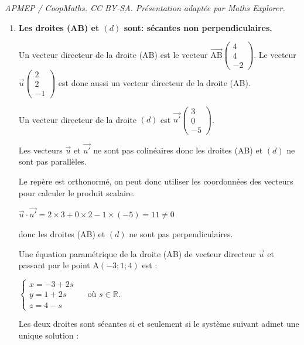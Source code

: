 \documentclass[10pt]{article}
\providecommand{\R}{\mathbb{R}}
\providecommand{\vect}[1]{\overrightarrow{#1}}
\begin{document}
\noindent\textit{APMEP / CoopMaths. CC BY-SA. Présentation adaptée par Maths Explorer.}\par\medskip
\medskip

\begin{enumerate}
\item \textbf{Les droites (AB) et $(d)$ sont: sécantes non perpendiculaires.}

\medskip 

Un vecteur directeur de la droite (AB) est  le vecteur $\vect{\mathrm{AB}} \begin{pmatrix}  4\\4\\-2
\end{pmatrix}$.  Le vecteur $\vect{u} \begin{pmatrix}  2\\2\\-1
\end{pmatrix}$  est donc aussi un vecteur directeur de la droite (AB).

Un vecteur directeur de la droite $(d)$ est $\vect{u'} \begin{pmatrix}
3\\0\\- 5
\end{pmatrix}$.

Les vecteurs $\vect{u}$ et $\vect{u'}$ ne sont pas colinéaires donc les droites (AB) et $(d)$ ne sont pas parallèles.

Le repère est orthonormé, on peut donc utiliser les coordonnées des vecteurs pour calculer le produit scalaire.

 $\vect{u} \cdot \vect{u'} =2 \times 3 + 0 \times 2 - 1 \times (-5) = 11 \neq 0$

donc  les droites (AB) et $(d)$ ne sont pas perpendiculaires.

Une équation paramétrique de la droite (AB) de vecteur directeur $\vect{u}$ et passant par le point A$(-3;1;4)$ est :

$\begin{cases}x=-3+2 s\\ y=1 +2s \\ z=4-s\end{cases} \quad \text{ où } s \in \R$.

Les deux droites sont sécantes si et seulement si le système suivant admet une unique solution :


\end{enumerate}
\end{document}

